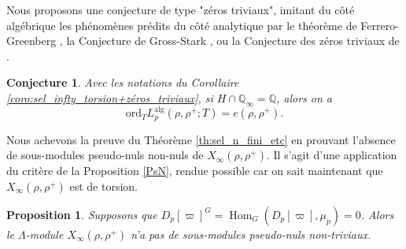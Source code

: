 \documentclass[12pt]{amsart}
\newcommand\bQ{\mathbb{Q}}
\newcommand{\ord}{\mathrm{ord}}
\newcommand{\alg}{\textrm{alg}}
\DeclareMathOperator{\Hom}{Hom}
\theoremstyle{defstyle}
\theoremstyle{thmstyle}
\newtheorem{proposition}[subsubsection]{Proposition}
\newtheorem{conjecture}[subsubsection]{Conjecture}
\begin{document}
Nous proposons une conjecture de type "zéros triviaux", imitant du côté algébrique les phénomènes prédits du côté analytique par le théorème de Ferrero-Greenberg \cite{ferrerogreenberg}, la Conjecture de Gross-Stark \cite{gross1981padic}, ou la Conjecture des zéros triviaux de \cite{benois}.

\begin{conjecture}\label{conj:zeros_triviaux}
	Avec les notations du Corollaire \ref{coro:sel_infty_torsion+zéros_triviaux}, si $H\cap \bQ_\infty =\bQ$, alors on a 
	$$\ord_{T} L_p^{\alg}(\rho,\rho^+;T) = e(\rho,\rho^+).$$
\end{conjecture}

Nous achevons la preuve du Théorème \ref{th:sel_n_fini_etc} en prouvant l'absence de sous-modules pseudo-nuls non-nuls de $X_\infty(\rho,\rho^+)$. Il s'agit d'une application du critère de la Proposition \ref{PsN}, rendue possible car on sait maintenant que $X_\infty(\rho,\rho^+)$ est de torsion.

\begin{proposition}\label{prop:sel_infty_sans_sous_modules_finis}
	Supposons que $D_p[\varpi]^G=\Hom_G(D_p[\varpi],\mu_p)=0$. Alors le $\Lambda$-module $X_\infty(\rho,\rho^+)$ n'a pas de sous-modules pseudo-nuls non-triviaux.
\end{proposition}
\end{document}
